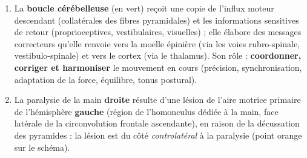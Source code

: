 \documentclass[11pt]{article}
\begin{document}
\begin{corrige}
\begin{enumerate}
\begin{popfigure}
\end{popfigure}
\item La \textbf{boucle cérébelleuse} (en vert) reçoit une copie de l'influx moteur descendant (collatérales des fibres pyramidales) et les informations sensitives de retour (proprioceptives, vestibulaires, visuelles) ; elle élabore des messages correcteurs qu'elle renvoie vers la moelle épinière (via les voies rubro-spinale, vestibulo-spinale) et vers le cortex (via le thalamus). Son rôle : \textbf{coordonner, corriger et harmoniser} le mouvement en cours (précision, synchronisation, adaptation de la force, équilibre, tonus postural).
\item La paralysie de la main \textbf{droite} résulte d'une lésion de l'aire motrice primaire de l'hémisphère \textbf{gauche} (région de l'homonculus dédiée à la main, face latérale de la circonvolution frontale ascendante), en raison de la décussation des pyramides : la lésion est du côté \emph{controlatéral} à la paralysie (point orange sur le schéma).
\end{enumerate}
\end{corrige}
\end{document}
